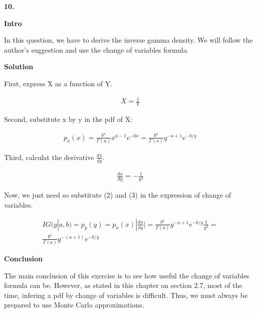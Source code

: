\documentclass[a4paper,10pt]{book}
\begin{document}
\textbf{10.}

\textbf{Intro} \par
In this question, we have to derive the inverse gamma density. We will follow the author's suggestion
and use the change of variables formula.\par


\textbf{Solution} \par

First, express X as a function of Y.

\begin{equation}
\begin{split}
X = \frac{1}{Y}
\end{split}
\end{equation}

Second, substitute x by y in the pdf of X:

\begin{equation}
\begin{split}
p_x(x) = \frac{b^a}{\Gamma(a)}x^{a-1}e^{-bx} = \frac{b^a}{\Gamma(a)}y^{-a+1}e^{-b/y}
\end{split}
\end{equation}

Third, calculat the derivative $\frac{dx}{dy}$.

\begin{equation}
\begin{split}
\frac{dx}{dy} = -\frac{1}{y^2}
\end{split}
\end{equation}

Now, we just need so substitute (2) and (3) in the expression of change of variables.

\begin{equation}
\begin{split}
IG(y|a,b) = p_y(y) = p_x(x)|\frac{dx}{dy}| = \frac{b^a}{\Gamma(a)}y^{-a+1}e^{-b/y}\frac{1}{y^2} = \\
\frac{b^a}{\Gamma(a)}y^{-(a+1)}e^{-b/y}
\end{split}
\end{equation}




\textbf{Conclusion} \par

The main conclusion of this exercise is to see how useful the change of variables formula can be.
However, as stated in this chapter on section 2.7, most of the time, infering a pdf by change of 
variables is difficult. 
Thus, we must always be prepared to use Monte Carlo approximations.
\end{document}
